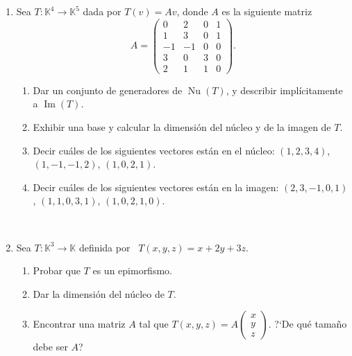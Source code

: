 \documentclass[12pt]{amsart}
\begin{document}
\begin{enumerate}[resume, topsep=5pt,itemsep=5pt]
\begin{enumerate}
 \item\label{Txyz nucleo} Dar un conjunto de generadores del n\'ucleo, y describir mediante ecuaciones \linebreak (impl\'icitamente) a la imagen.

 \item\label{matriz} Encontrar una matriz  $A\in\mathbb{K}^{3\times 3}$ tal que $T(x,y,z)=A\left(\begin{matrix}
	x\\y\\z \end{matrix}\right)$. 
	
\end{enumerate}

\


\item Sea $T: \mathbb{K}^4 \to \mathbb{K}^5$ dada por $T(v) = Av$, donde $A$ es la siguiente matriz
	$$
	A=\left(\begin{matrix}
	0& 2& 0&1\\   1& 3& 0&1\\  -1&-1&0&0\\3&0&3&0\\2&1&1&0 \end{matrix}
	\right).
	$$
	\begin{enumerate}[topsep=5pt,itemsep=5pt]
        \item Dar un conjunto de generadores de $\operatorname{Nu}(T)$, y describir impl\'icitamente a $\operatorname{Im}(T)$.
		\item Exhibir una base y calcular la dimensi\'{o}n del n\'ucleo y de la imagen de $T$.
		\item Decir cu\'ales de los siguientes vectores est\'an en el n\'ucleo:
		$(1,2,3,4)$, $(1,-1,-1,2)$, $(1,0,2,1)$.
		\item Decir cu\'ales de los siguientes vectores est\'an en la imagen:
		$(2,3,-1,0,1)$, $(1,1,0,3,1)$, $(1,0,2,1,0)$.
	\end{enumerate}
	
\
	
\item\label{funcional ej}  Sea $T:\mathbb{K}^3\longrightarrow\mathbb{K}$ definida por \ $T(x,y,z)=x+2y+3z$.

\begin{enumerate}
 \item Probar que $T$ es un epimorfismo.
 \item Dar la dimensi\'on del n\'ucleo de $T$.
 \item Encontrar una matriz $A$ tal que $T(x,y,z)=A\left(\begin{matrix}	x\\y\\z \end{matrix}\right)$.
  ?`De qu\'e tama\~no debe ser $A$?
\end{enumerate}


\end{enumerate}
\end{document}
